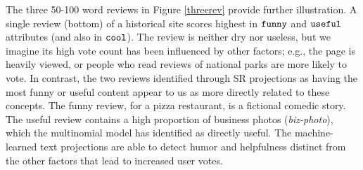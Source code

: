 \documentclass[12pt]{article}
\begin{document}
The three 50-100 word reviews in Figure \ref{threerev} provide further
illustration.  A single review (bottom) of a historical site scores highest in
${\tt funny}$ and ${\tt useful}$  attributes (and also in ${\tt cool}$). The
review is neither dry nor useless, but we imagine its high vote count has been
influenced by other factors; e.g., the page is heavily viewed, or people who
read reviews of national parks are more likely to vote. In contrast, the two
reviews identified through SR projections as having the most funny or useful
content appear to us as more directly related to these concepts.  The funny
review, for a pizza restaurant, is a fictional comedic story. The useful
review contains a high proportion of business photos ({\it biz-photo}), which
the multinomial model has identified as directly useful.  The machine-learned
text projections are able to detect humor and helpfulness distinct from the other
factors that lead to increased user votes.
\end{document}
